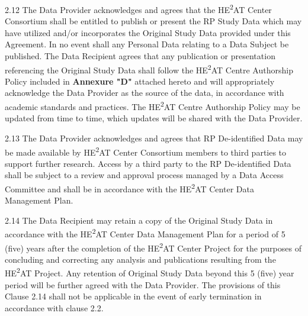2.12 The Data Provider acknowledges and agrees that the HE\textsuperscript{2}AT Center Consortium shall be entitled to publish or present the RP Study Data which may have utilized and/or incorporates the Original Study Data provided under this Agreement. In no event shall any Personal Data relating to a Data Subject be published. The Data Recipient agrees that any publication or presentation referencing the Original Study Data shall follow the HE\textsuperscript{2}AT Centre Authorship Policy included in \textbf{Annexure "D"} attached hereto and will appropriately acknowledge the Data Provider as the source of the data, in accordance with academic standards and practices. The HE\textsuperscript{2}AT Centre Authorship Policy may be updated from time to time, which updates will be shared with the Data Provider.

2.13 The Data Provider acknowledges and agrees that RP De-identified Data may be made available by HE\textsuperscript{2}AT Center Consortium members to third parties to support further research. Access by a third party to the RP De-identified Data shall be subject to a review and approval process managed by a Data Access Committee and shall be in accordance with the HE\textsuperscript{2}AT Center Data Management Plan. 

2.14 The Data Recipient may retain a copy of the Original Study Data in accordance with the HE\textsuperscript{2}AT Center Data Management Plan for a period of 5 (five) years after the completion of the HE\textsuperscript{2}AT Center Project for the purposes of concluding and correcting any analysis and publications resulting from the HE\textsuperscript{2}AT Project. Any retention of Original Study Data beyond this 5 (five) year period will be further agreed with the Data Provider. The provisions of this Clause 2.14 shall not be applicable in the event of early termination in accordance with clause 2.2. 

